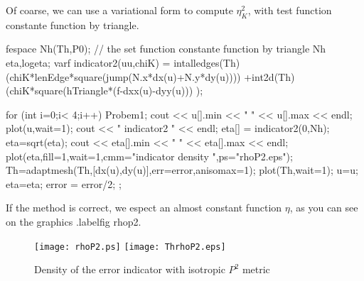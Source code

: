 \documentclass[twoside]{book}
\begin{document}
 
Of coarse, we can use a variational form to compute $\eta_{K}^{2}$,
with test function constante function by triangle.
\bFF
  
fespace Nh(Th,P0); // the set function constante function by triangle Nh eta,logeta;
varf indicator2(uu,chiK) = 
       intalledges(Th)(chiK*lenEdge*square(jump(N.x*dx(u)+N.y*dy(u))))     +int2d(Th)(chiK*square(hTriangle*(f-dxx(u)-dyy(u))) );
\eFF

\bFF

for (int i=0;i< 4;i++)
{   Probem1;
  cout << u[].min << " " << u[].max << endl; 
  plot(u,wait=1);
   cout << " indicator2 " << endl; 
  eta[] = indicator2(0,Nh);
  eta=sqrt(eta);
  cout << eta[].min << " " << eta[].max << endl;
  plot(eta,fill=1,wait=1,cmm="indicator density ",ps="rhoP2.eps");
  Th=adaptmesh(Th,[dx(u),dy(u)],err=error,anisomax=1);
  plot(Th,wait=1);
  u=u;
  eta=eta;
  error = error/2;
} ;
\eFF

If the method is correct, we espect an almost constant function $\eta$, as you can see 
on the graphics .label{fig rhop2}.
\begin{figure}[hbt]
\begin{center}
\texttt{[image: rhoP2.ps]} \texttt{[image: ThrhoP2.eps]}
\end{center}
\caption{Density of the error indicator  with isotropic $P^{2}$ metric }
\end{figure}
\end{document}
